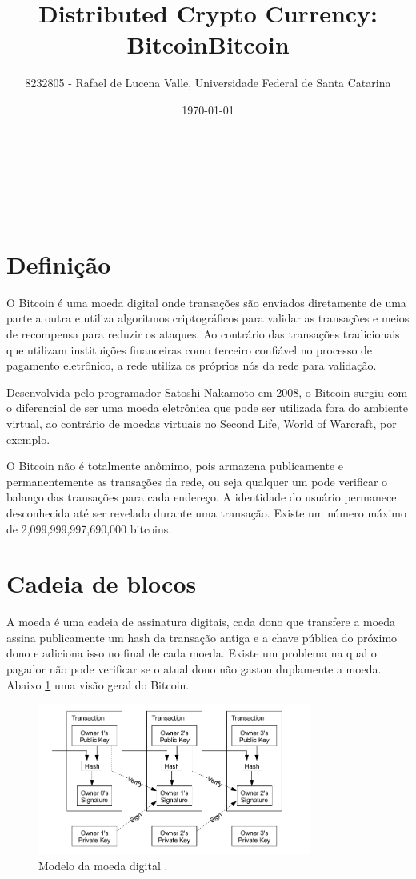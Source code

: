 \documentclass[a4paper,11pt]{article}
\makeatletter
\newcommand{\linia}{\rule{\linewidth}{0.5pt}}
\theoremstyle{mytheor}
\renewcommand{\maketitle}{
\begin{center}
\vspace{2ex}
{\huge \textsc{\@title}}
\vspace{1ex}
\\
\linia\\
\@author \hfill \@date
\vspace{4ex}
\end{center}
}
\makeatother
\begin{document}
\title{Distributed Crypto Currency: Bitcoin}

\author{8232805 - Rafael de Lucena Valle, Universidade Federal de Santa Catarina}

\date{\today}

\maketitle

\title{Bitcoin}

\section*{Definição}
O Bitcoin é uma moeda digital onde transações são enviados diretamente de uma parte a outra e utiliza algoritmos criptográficos para validar as transações e meios de recompensa para reduzir os ataques. Ao contrário das transações tradicionais que utilizam instituições financeiras como terceiro confiável no processo de pagamento eletrônico, a rede utiliza os próprios nós da rede para validação. 

Desenvolvida pelo programador Satoshi Nakamoto em 2008, o Bitcoin surgiu com o diferencial de ser uma moeda eletrônica que pode ser utilizada fora do ambiente virtual, ao contrário de moedas virtuais no Second Life, World of Warcraft, por exemplo.

O Bitcoin não é totalmente anômimo, pois armazena publicamente e permanentemente as transações da rede, ou seja qualquer um pode verificar o balanço das transações para cada endereço. A identidade do usuário permanece desconhecida até ser revelada durante uma transação. Existe um número máximo de 2,099,999,997,690,000 bitcoins.

\section*{Cadeia de blocos}
A moeda é uma cadeia de assinatura digitais, cada dono que transfere a moeda assina publicamente um hash da transação antiga e a chave pública do próximo dono e adiciona isso no final de cada moeda. Existe um problema na qual o pagador não pode verificar se o atual dono não gastou duplamente a moeda. Abaixo \ref{bitcoin} uma visão geral do Bitcoin.

\begin{figure}[H]
   \label{bitcoin}
   \centering
   \includegraphics[width=0.8\textwidth]{images/coin.png}
   \caption{Modelo da moeda digital \cite{nakamoto2008bitcoin}.}
\end{figure}
\end{document}
